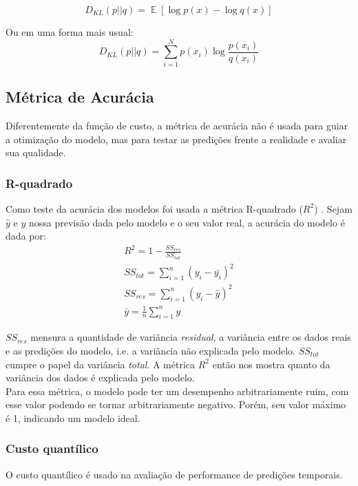 \[D_{KL}(p || q) = \mathop{\mathbb{E}}[\log p(x) - \log q(x)]​\]

Ou em uma forma mais usual: \\

\[D_{KL}(p||q) = \sum_{i=1}^{N}p(x_{i}) \log \frac{p(x_{i})}{q(x_{i})}​\]



\subsection{Métrica de Acurácia}

Diferentemente da função de custo, a métrica de acurácia não é usada para guiar a otimização do modelo,
mas para testar as predições frente a realidade e avaliar sua qualidade. \\

\subsubsection{R-quadrado}
Como teste da acurácia dos modelos foi usada a métrica R-quadrado ($R^2$) \citep{cohen}. Sejam $\hat{y}$ e $y$ nossa previsão dada pelo modelo e o seu valor real, a acurácia do modelo é dada por:\\

\begin{align}
&R^2 = 1 - \frac{SS_{res}}{SS_{tot}} &\\
&SS_{tot} = \sum^n_{i=1} (y_i- \bar{y_i})^2 &\\
&SS_{res} = \sum^n_{i=1} (y_i - \hat{y})^2 &\\
&\bar{y} = \frac{1}{n} \sum^n_{i=1} y &
\end{align}

$SS_{res}$ mensura a quantidade de variância \textit{residual}, a
variância entre os dados reais e as predições do modelo, i.e. a variância não
explicada pelo modelo. $SS_{tot}$ cumpre o papel da variância \textit{total}. A métrica $R^2$
então nos mostra quanto da variância dos dados é explicada pelo modelo. \\

Para essa métrica, o modelo pode ter um desempenho arbitrariamente ruim, com esse valor
podendo se tornar arbitrariamente negativo. Porém, seu valor máximo é 1,
indicando um modelo ideal.\\


\subsubsection{Custo quantílico}
\label{sec:quant}
O custo quantílico \citep{deepar} é usado na avaliação de performance de
predições temporais. \\

